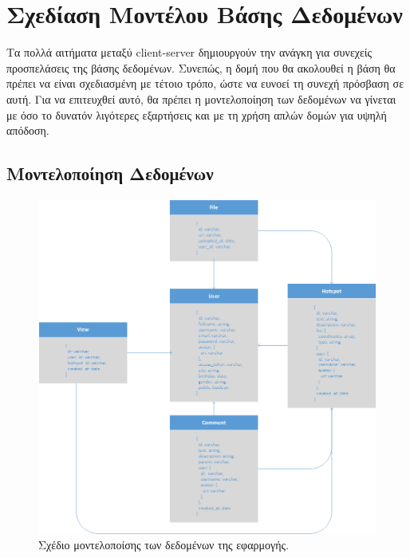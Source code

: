 \section{Σχεδίαση Μοντέλου Βάσης Δεδομένων}
Τα πολλά αιτήματα μεταξύ client-server δημιουργούν την ανάγκη για συνεχείς προσπελάσεις της βάσης δεδομένων. Συνεπώς, η δομή που θα ακολουθεί η βάση θα πρέπει να είναι σχεδιασμένη με τέτοιο τρόπο, ώστε να ευνοεί τη συνεχή πρόσβαση σε αυτή. Για να επιτευχθεί αυτό, θα πρέπει η μοντελοποίηση των δεδομένων να γίνεται με όσο το δυνατόν λιγότερες εξαρτήσεις και με τη χρήση απλών δομών για υψηλή απόδοση. 

\subsection{Μοντελοποίηση Δεδομένων}


\begin{figure}[H]
    \centering
    \includegraphics[scale=0.5]{figures/db-models.png}
    \caption{Σχέδιο μοντελοποίσης των δεδομένων της εφαρμογής.}
    \label{dbmodel}
\end{figure}

